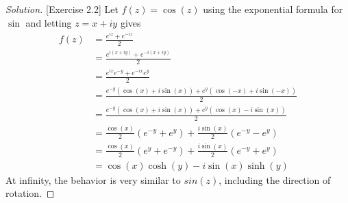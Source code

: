 \documentclass[11pt,letterpaper]{article}
\newenvironment{solution}
{\renewcommand\qedsymbol{}\begin{proof}[Solution]}
	{\end{proof}\bigskip}
\begin{document}
\begin{solution}[Exercise 2.2]
	Let $f(z) = \cos(z)$ using the exponential formula for $\sin$ and letting $z = x+iy$ gives
	\[\begin{split}
		f(z) &= \frac{e^{iz}+e^{-iz}}{2}\\
		&= \frac{e^{i(x+iy)}+e^{-i(x+iy)}}{2}\\
		&= \frac{e^{ix}e^{-y} +e^{-ix}e^{y}}{2}\\
		&= \frac{e^{-y}(\cos(x)+i\sin(x))+e^y(\cos(-x)+i\sin(-x))}{2}\\
		&= \frac{e^{-y}(\cos(x)+i\sin(x))+e^y(\cos(x)-i\sin(x))}{2}\\
		&= \frac{\cos(x)}{2}(e^{-y}+e^y)+\frac{i\sin(x)}{2}(e^{-y}-e^y)\\
		&= \frac{\cos(x)}{2}(e^{y}+e^{-y})+\frac{i\sin(x)}{2}(e^{-y}+e^y)\\
		& = \cos(x)\cosh(y) - i\sin(x)\sinh(y)
	\end{split}\]
	At infinity, the behavior is very similar to $sin(z)$, including the direction of rotation. 
	\end{solution}	
\end{document}
